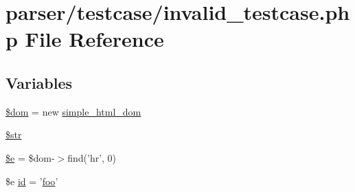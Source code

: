\hypertarget{invalid__testcase_8php}{\section{parser/testcase/invalid\+\_\+testcase.php File Reference}
\label{invalid__testcase_8php}
}
\subsection*{Variables}
\begin{DoxyCompactItemize}
\item 
\hyperlink{invalid__testcase_8php_a46127a794280dd592812c25b62af34b0}{\$dom} = new \hyperlink{classsimple__html__dom}{simple\+\_\+html\+\_\+dom}
\item 
\hyperlink{invalid__testcase_8php_a7542d95618011800c61773127fa625cf}{\$str}
\item 
\hyperlink{invalid__testcase_8php_ab74076a9b7e1d23d12b9e8d65e60315a}{\$e} = \$dom-\/$>$find('hr', 0)
\item 
\$e \hyperlink{invalid__testcase_8php_af94d69fa7897fa25e80204500b8586eb}{id} = '\hyperlink{strip__testcase_8php_aa901575d6c772d2340f7e16cf7028985}{foo}'
\end{DoxyCompactItemize}


